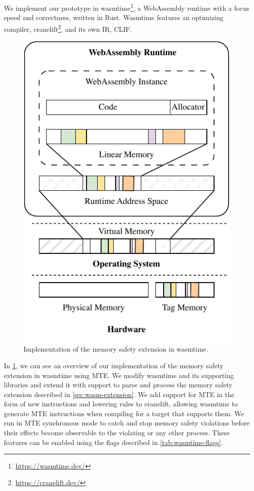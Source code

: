 We implement our prototype in wasmtime\footnote{\url{https://wasmtime.dev/}}, a WebAssembly runtime with a focus speed and correctness, written in Rust.
Wasmtime features an optimizing compiler, cranelift\footnote{\url{https://cranelift.dev/}}, and its own \ac{IR}, \ac{CLIF}.

\begin{figure}[t]
  \centering
  \includegraphics[scale=1]{figures/build/system-design-2}
  \caption{Implementation of the memory safety extension in wasmtime.}
  \label{fig:wasmtime-mte-impl}
\end{figure}

In \cref{fig:wasmtime-mte-impl}, we can see an overview of our implementation of the memory safety extension in wasmtime using \ac{MTE}.
We modify wasmtime and its supporting libraries and extend it with support to parse and process the memory safety extension described in \cref{sec:wasm-extension}.
We add support for \ac{MTE} in the form of new instructions and lowering rules to cranelift, allowing wasmtime to generate \ac{MTE} instructions when compiling for a target that supports them.
We run in \ac{MTE} synchronous mode to catch and stop memory safety violations before their effects become observable to the violating or any other process.
These features can be enabled using the flags described in \cref{tab:wasmtime-flags}.

